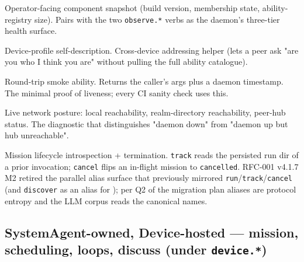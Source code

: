\documentclass[10pt,a4paper]{article}
\newcommand{\code}[1]{\texttt{\small #1}}
\begin{document}
\begin{description}[leftmargin=1.4em,style=nextline,itemsep=0.15em]
  \item[\codew{admin.status}] Operator-facing component snapshot
  (build version, membership state, ability-registry size). Pairs
  with the two \code{observe.*} verbs as the daemon's three-tier
  health surface.
  \item[\codew{device.describe}] Device-profile self-description.
  Cross-device addressing helper (lets a peer ask "are you who I
  think you are" without pulling the full ability catalogue).
  \item[\codew{observe.health}] Round-trip smoke ability. Returns
  the caller's args plus a daemon timestamp. The minimal proof of
  liveness; every CI sanity check uses this.
  \item[\codew{observe.network_health}] Live network posture: local
  reachability, realm-directory reachability, peer-hub status. The
  diagnostic that distinguishes "daemon down" from "daemon up but
  hub unreachable".
  \item[\codew{mission.track}, \codew{mission.cancel}]
  Mission lifecycle introspection + termination. \code{track}
  reads the persisted run dir of a prior 
  invocation; \code{cancel} flips an in-flight mission to
  \texttt{cancelled}. RFC-001 v4.1.7 M2 retired the parallel
   alias surface that previously mirrored
  \code{run}/\code{track}/\code{cancel} (and \code{discover} as an
  alias for ); per Q2 of the
  migration plan aliases are protocol entropy and the LLM corpus
  reads the canonical names.
\end{description}

\subsection{SystemAgent-owned, Device-hosted --- mission, scheduling, loops, discuss (under \texttt{\small device.*})}
\end{document}
